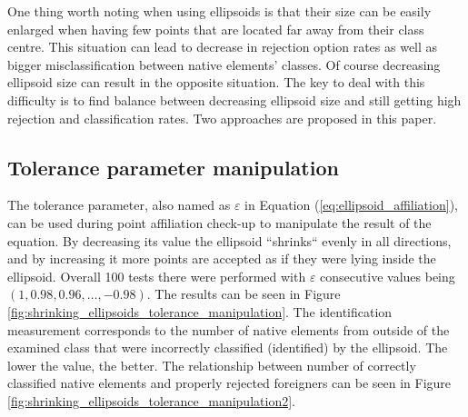 One thing worth noting when using ellipsoids is that their size can be easily enlarged when having few points that are located far away from their class centre. This situation can lead to decrease in rejection option rates as well as bigger misclassification between native elements' classes. Of course decreasing ellipsoid size can result in the opposite situation. The key to deal with this difficulty is to find balance between decreasing ellipsoid size and still getting high rejection and classification rates. Two approaches are proposed in this paper.

\subsection{Tolerance parameter manipulation}

The tolerance parameter, also named as $\varepsilon$ in Equation (\ref{eq:ellipsoid_affiliation}), can be used during point affiliation check-up to manipulate the result of the equation. By decreasing its value the ellipsoid ``shrinks`` evenly in all directions, and by increasing it more points are accepted as if they were lying inside the ellipsoid. Overall 100 tests there were performed with $\varepsilon$ consecutive values being~$(1, 0.98, 0.96, \dots, -0.98)$. The results can be seen in Figure \ref{fig:shrinking_ellipsoids_tolerance_manipulation}. The identification measurement corresponds to the number of native elements from outside of the examined class that were incorrectly classified (identified) by the ellipsoid. The lower the value, the better. The relationship between number of correctly classified native elements and properly rejected foreigners can be seen in Figure \ref{fig:shrinking_ellipsoids_tolerance_manipulation2}.

